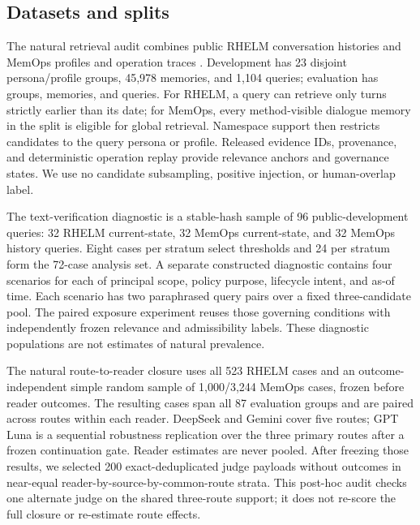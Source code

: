 \documentclass{article}
\begin{document}
\subsection{Datasets and splits}

The natural retrieval audit combines public RHELM conversation histories and MemOps
profiles and operation traces \citep{zhang2026rhelm,hao2026memops}.  Development has
23 disjoint persona/profile groups, 45,978 memories, and 1,104 queries; evaluation has
\NaturalGroupCount{} groups, \NaturalMemoryCount{} memories, and
\NaturalQueryCount{} queries.  For RHELM, a query can retrieve only turns strictly
earlier than its date; for MemOps, every method-visible dialogue memory in the split
is eligible for global retrieval.  Namespace support then restricts candidates to the
query persona or profile.  Released evidence IDs, provenance, and deterministic
operation replay provide relevance anchors and governance states.  We use no
candidate subsampling, positive injection, or human-overlap label.

The text-verification diagnostic is a stable-hash sample of 96 public-development
queries: 32 RHELM current-state, 32 MemOps current-state, and 32 MemOps history
queries.  Eight cases per stratum select thresholds and 24 per stratum form the 72-case
analysis set.  A separate constructed diagnostic contains four scenarios for each of
principal scope, policy purpose, lifecycle intent, and as-of time.  Each scenario has
two paraphrased query pairs over a fixed three-candidate pool.  The paired exposure
experiment reuses those governing conditions with independently frozen relevance and
admissibility labels.  These diagnostic populations are not estimates of natural
prevalence.

The natural route-to-reader closure uses all 523 RHELM cases and an outcome-
independent simple random sample of 1,000/3,244 MemOps cases, frozen before reader
outcomes.  The resulting \NaturalEndToEndCaseCount{} cases span all 87 evaluation
groups and are paired across routes within each reader.  DeepSeek and Gemini cover
five routes; GPT Luna is a sequential robustness replication over the three primary
routes after a frozen continuation gate.  Reader estimates are never pooled.
After freezing those results, we selected 200 exact-deduplicated judge payloads
without outcomes in near-equal reader-by-source-by-common-route strata.  This
post-hoc audit checks one alternate judge on the shared three-route support; it does
not re-score the full closure or re-estimate route effects.
\end{document}
